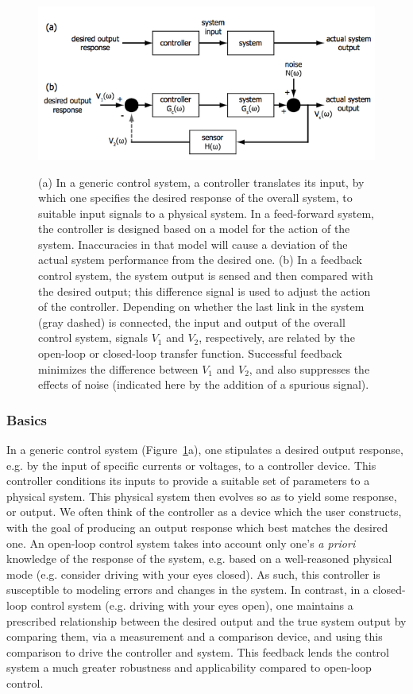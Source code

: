 \documentclass{../lab}
\begin{document}
\begin{figure}[h]
    \centering
    \href{http://experimentationlab.berkeley.edu/sites/default/files/images/600px-MOTimage001.png}{\includegraphics[width=0.9\linewidth]{images/600px-MOTimage001.png}}
    \caption{(a) In a generic control system, a controller translates its input, by which one specifies the desired response of the overall system, to suitable input signals to a physical system. In a feed-forward system, the controller is designed based on a model for the action of the system. Inaccuracies in that model will cause a deviation of the actual system performance from the desired one. (b) In a feedback control system, the system output is sensed and then compared with the desired output; this difference signal is used to adjust the action of the controller. Depending on whether the last link in the system (gray dashed) is connected, the input and output of the overall control system, signals $V_1$ and $V_2$, respectively, are related by the open-loop or closed-loop transfer function. Successful feedback minimizes the difference between $V_1$ and $V_2$, and also suppresses the effects of noise (indicated here by the addition of a spurious signal).}
    \label{fig:GenericControlSystem}
\end{figure}

\subsubsection{Basics}

In a generic control system (Figure~\ref{fig:GenericControlSystem}a), one stipulates a desired output response, e.g. by the input of specific currents or voltages, to a controller device. This controller conditions its inputs to provide a suitable set of parameters to a physical system. This physical system then evolves so as to yield some response, or output. We often think of the controller as a device which the user constructs, with the goal of producing an output response which best matches the desired one. An open-loop control system takes into account only one’s \emph{a priori} knowledge of the response of the system, e.g. based on a well-reasoned physical mode (e.g. consider driving with your eyes closed). As such, this controller is susceptible to modeling errors and changes in the system. In contrast, in a closed-loop control system (e.g. driving with your eyes open), one maintains a prescribed relationship between the desired output and the true system output by comparing them, via a measurement and a comparison device, and using this comparison to drive the controller and system. This feedback lends the control system a much greater robustness and applicability compared to open-loop control.
\end{document}
